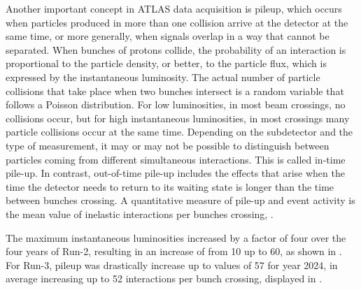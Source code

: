 Another important concept in \ac{ATLAS} data acquisition is pileup, which occurs when particles produced in more than one \pp collision arrive at the detector at the same time, or more generally, when signals overlap in a way that cannot be separated. When bunches of protons collide, the probability of an interaction is proportional to the particle density, or better, to the particle flux, which is expressed by the instantaneous luminosity. The actual number of particle collisions that take place when two bunches intersect is a random variable that follows a Poisson distribution. For low luminosities, in most beam crossings, no collisions occur, but for high instantaneous luminosities, in most crossings many particle collisions occur at the same time. Depending on the subdetector and the type of measurement, it may or may not be possible to distinguish between particles coming from different simultaneous interactions. This is called in-time pile-up. In contrast, out-of-time pile-up includes the effects that arise when the time the detector needs to return to its waiting state is longer than the time between bunches crossing. A quantitative measure of pile-up and event activity is the mean value of \pp inelastic interactions per bunches crossing, \avgmu.

The maximum instantaneous luminosities increased by a factor of four over the four years of Run-2, resulting in an increase of \avgmu from 10 up to 60, as shown in \Fig{\ref{fig:atlas:runs:pileup_run2}}. For Run-3, pileup was drastically increase up to values of 57 for year 2024, in average increasing up to 52 interactions per bunch crossing, displayed in \Fig{\ref{fig:atlas:runs:pileup_run3}}.

